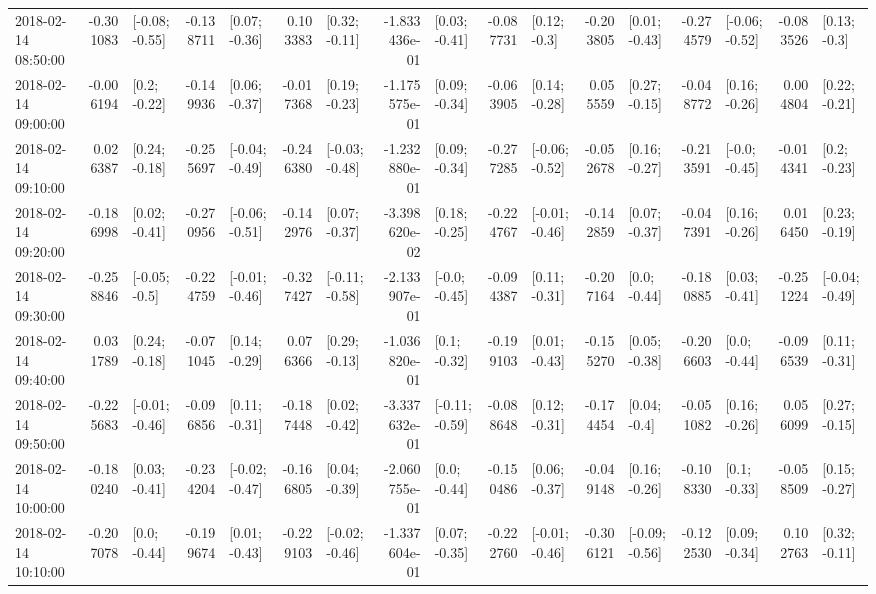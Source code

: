 \begin{tabular}{lrlrlrlrlrlrlrlrl}
2018-02-14 08:50:00 & -0.301083 &  [-0.08; -0.55] & -0.138711 &   [0.07; -0.36] &  0.103383 &   [0.32; -0.11] & -1.833436e-01 &   [0.03; -0.41] & -0.087731 &    [0.12; -0.3] & -0.203805 &   [0.01; -0.43] & -0.274579 &  [-0.06; -0.52] & -0.083526 &    [0.13; -0.3] \\
2018-02-14 09:00:00 & -0.006194 &    [0.2; -0.22] & -0.149936 &   [0.06; -0.37] & -0.017368 &   [0.19; -0.23] & -1.175575e-01 &   [0.09; -0.34] & -0.063905 &   [0.14; -0.28] &  0.055559 &   [0.27; -0.15] & -0.048772 &   [0.16; -0.26] &  0.004804 &   [0.22; -0.21] \\
2018-02-14 09:10:00 &  0.026387 &   [0.24; -0.18] & -0.255697 &  [-0.04; -0.49] & -0.246380 &  [-0.03; -0.48] & -1.232880e-01 &   [0.09; -0.34] & -0.277285 &  [-0.06; -0.52] & -0.052678 &   [0.16; -0.27] & -0.213591 &   [-0.0; -0.45] & -0.014341 &    [0.2; -0.23] \\
2018-02-14 09:20:00 & -0.186998 &   [0.02; -0.41] & -0.270956 &  [-0.06; -0.51] & -0.142976 &   [0.07; -0.37] & -3.398620e-02 &   [0.18; -0.25] & -0.224767 &  [-0.01; -0.46] & -0.142859 &   [0.07; -0.37] & -0.047391 &   [0.16; -0.26] &  0.016450 &   [0.23; -0.19] \\
2018-02-14 09:30:00 & -0.258846 &   [-0.05; -0.5] & -0.224759 &  [-0.01; -0.46] & -0.327427 &  [-0.11; -0.58] & -2.133907e-01 &   [-0.0; -0.45] & -0.094387 &   [0.11; -0.31] & -0.207164 &    [0.0; -0.44] & -0.180885 &   [0.03; -0.41] & -0.251224 &  [-0.04; -0.49] \\
2018-02-14 09:40:00 &  0.031789 &   [0.24; -0.18] & -0.071045 &   [0.14; -0.29] &  0.076366 &   [0.29; -0.13] & -1.036820e-01 &    [0.1; -0.32] & -0.199103 &   [0.01; -0.43] & -0.155270 &   [0.05; -0.38] & -0.206603 &    [0.0; -0.44] & -0.096539 &   [0.11; -0.31] \\
2018-02-14 09:50:00 & -0.225683 &  [-0.01; -0.46] & -0.096856 &   [0.11; -0.31] & -0.187448 &   [0.02; -0.42] & -3.337632e-01 &  [-0.11; -0.59] & -0.088648 &   [0.12; -0.31] & -0.174454 &    [0.04; -0.4] & -0.051082 &   [0.16; -0.26] &  0.056099 &   [0.27; -0.15] \\
2018-02-14 10:00:00 & -0.180240 &   [0.03; -0.41] & -0.234204 &  [-0.02; -0.47] & -0.166805 &   [0.04; -0.39] & -2.060755e-01 &    [0.0; -0.44] & -0.150486 &   [0.06; -0.37] & -0.049148 &   [0.16; -0.26] & -0.108330 &    [0.1; -0.33] & -0.058509 &   [0.15; -0.27] \\
2018-02-14 10:10:00 & -0.207078 &    [0.0; -0.44] & -0.199674 &   [0.01; -0.43] & -0.229103 &  [-0.02; -0.46] & -1.337604e-01 &   [0.07; -0.35] & -0.222760 &  [-0.01; -0.46] & -0.306121 &  [-0.09; -0.56] & -0.122530 &   [0.09; -0.34] &  0.102763 &   [0.32; -0.11] \\

\end{tabular}
